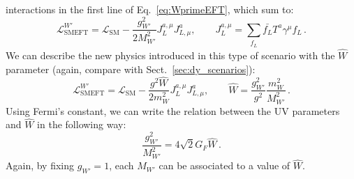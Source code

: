 \documentclass[withindex,glossary]{cam-thesis}
\begin{document}
interactions in the first line of Eq.~\eqref{eq:WprimeEFT}, which sum to:
\begin{equation}
\label{eq:wprimeL}
	\mathcal{L}^{W'}_{\text{SMEFT}} = \mathcal{L}_{\text{SM}} -\frac{g_{W'}^{2}}{2 M^2_{W'}} J^{a, \mu}_L J^a_{L, \mu}, \qquad J^{a, \mu}_L = \sum_{\substack{f_L}} \bar{f_L} T^a \gamma^{\mu} f_L \, .
\end{equation}
%
We can describe the new physics introduced in this type of scenario with the $\hat{W}$ parameter (again, compare with Sect.~\ref{sec:dy_scenarios}):
%
\begin{equation}
	\mathcal{L}^{W'}_{\text{SMEFT}} = \mathcal{L}_{\text{SM}} -\frac{g^{2} \hat{W}}{2 m^2_W} J^{a, \mu}_L J^a_{L, \mu}, \qquad \hat{W} = \frac{g_{W'}^{2}}{g^{2}} \frac{m_{W}^{2}}{M_{W'}^{2}} \, .
\end{equation}
%
Using Fermi's constant, we can write the relation between the UV parameters and $\hat{W}$ in the following way:
%
\begin{equation}
	\frac{g_{W'}^{2}}{M_{W'}^{2}} = 4 \sqrt{2} G_{F} \hat{W} \, .
\end{equation}
%
Again, by fixing $g_{W'}=1$, each $M_{W'}$ can be associated to a value of $\hat{W}$.

\end{document}
